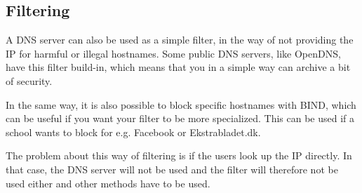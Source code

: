 \documentclass[Main]{subfiles}
\begin{document}
\subsection{Filtering}
A DNS server can also be used as a simple filter, in the way of not providing the IP for harmful or illegal hostnames. 
Some public DNS servers, like OpenDNS, have this filter build-in, which means that you in a simple way can archive a bit of security.

In the same way, it is also possible to block specific hostnames with BIND, which can be useful if you want your filter to be more specialized. 
This can be used if a school wants to block for e.g. Facebook or Ekstrabladet.dk.

The problem about this way of filtering is if the users look up the IP directly. 
In that case, the DNS server will not be used and the filter will therefore not be used either and other methods have to be used.
\end{document}

